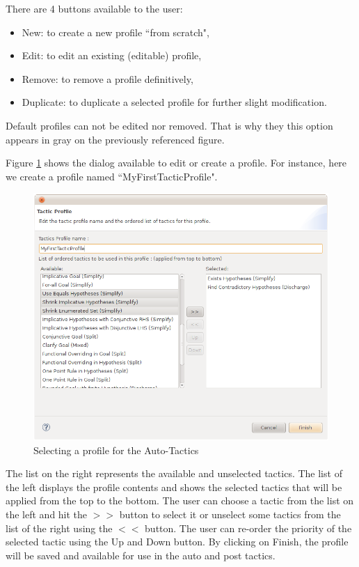 There are 4 buttons available to the user:

\begin{itemize}
	\item New: to create a new profile ``from scratch",
	\item Edit: to edit an existing (editable) profile,
	\item Remove: to remove a profile definitively,
	\item Duplicate: to duplicate a selected profile for further slight modification.
\end{itemize}

Default profiles can not be edited nor removed. That is why they this option appears in gray on the previously referenced figure.

Figure \ref{fig_ref_01_preferences10} shows the dialog available to edit or create a profile. For instance, here we create a profile named ``MyFirstTacticProfile".

\begin{figure}[!ht]
\begin{center}
	\includegraphics{img/reference/ref_01_preferences10.png}
	\caption{Selecting a profile for the Auto-Tactics}
	\label{fig_ref_01_preferences10}
\end{center}
\end{figure}

The list on the right represents the available and unselected tactics. The list of the left displays the profile contents and shows the selected tactics that will be applied from the top to the bottom. The user can choose a tactic from the list on the left and hit the \textsf{$>>$} button to select it or unselect some tactics from the list of the right using the \textsf{$<<$} button. The user can re-order the priority of the selected tactic using the \textsf{Up} and \textsf{Down} button. By clicking on \textsf{Finish}, the profile will be saved and available for use in the auto and post tactics.

